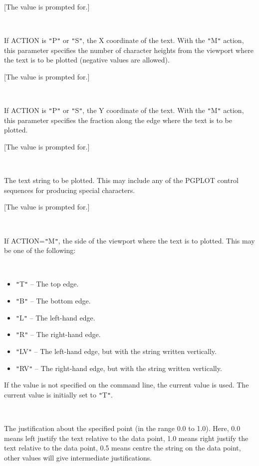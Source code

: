 \documentclass[twoside,11pt]{article}
\renewcommand{\_}{\texttt{\symbol{95}}}
\newcommand{\sstsubsection}[1]{ \item[{#1}] \mbox{} \\}
\newcommand{\sstitemlist}[1]{
  \mbox{} \\
  \vspace{-3.5ex}
  \begin{itemize}
     #1
  \end{itemize}
}
\newcommand{\sstitem}{\item}
\newcommand{\sstsubsection}[1]{\item[{#1}]}
\newcommand{\sstitemlist}[1]{
      \begin{itemize}
         #1
      \end{itemize}
      \\
   }
\newcommand{\sstitem}{\item}
\begin{document}
\begin{sloppypar}
{{{{         }
         [The value is prompted for.]
      }
      \sstsubsection{
         XPOS = \_REAL (Read and Write)
      }{
         If ACTION is {\tt "}P{\tt "} or {\tt "}S{\tt "}, the X coordinate of the text.  With
         the {\tt "}M{\tt "} action, this parameter specifies the number of
         character heights from the viewport where the text is to be
         plotted (negative values are allowed).

         [The value is prompted for.]
      }
      \sstsubsection{
         YPOS = \_REAL (Read and Write)
      }{
         If ACTION is {\tt "}P{\tt "} or {\tt "}S{\tt "}, the Y coordinate of the text.  With
         the {\tt "}M{\tt "} action, this parameter specifies the fraction along
         the edge where the text is to be plotted.

         [The value is prompted for.]
      }
      \sstsubsection{
         TEXT = \_CHAR (Read and Write)
      }{
         The text string to be plotted. This may include any of the
         PGPLOT control sequences for producing special characters.

         [The value is prompted for.]
      }
      \sstsubsection{
         SIDE = \_CHAR (Read and Write)
      }{
         If ACTION={\tt "}M{\tt "}, the side of the viewport where the text is to
         plotted. This may be one of the following:
         \sstitemlist{

            \sstitem
               {\tt "}T{\tt "} -- The top edge.

            \sstitem
               {\tt "}B{\tt "} -- The bottom edge.

            \sstitem
               {\tt "}L{\tt "} -- The left-hand edge.

            \sstitem
               {\tt "}R{\tt "} -- The right-hand edge.

            \sstitem
               {\tt "}LV{\tt "} -- The left-hand edge, but with the string written
               vertically.

            \sstitem
               {\tt "}RV{\tt "} -- The right-hand edge, but with the string written
               vertically.

         }
         If the value is not specified on the command line, the current
         value is used. The current value is initially set to {\tt "}T{\tt "}.
      }
      \sstsubsection{
         JUSTIFICATION = \_REAL (Read and Write)
      }{
         The justification about the specified point (in the range 0.0
         to 1.0).  Here, 0.0 means left justify the text relative to
         the data point, 1.0 means right justify the text relative to
         the data point, 0.5 means centre the string on the data point,
         other values will give intermediate justifications.

}}}
\end{sloppypar}
\end{document}

